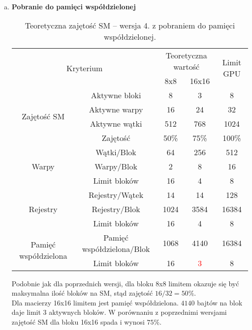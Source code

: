 \begin{enumerate}[(a)]
\item \textbf{Pobranie do pamięci współdzielonej} \newline

\begin{center}
\begin{table}[H]
\centering
\begin{tabular}{|c|c|c|c|c|}
\hline
\multicolumn{2}{|c|}{\multirow{2}{*}{Kryterium}} & \multicolumn{2}{c|}{Teoretyczna wartość} & \multirow{2}{*}{Limit GPU} \\ \cline{3-4}
\multicolumn{2}{|c|}{} & 8x8 & 16x16 & \\ \hline
\multirow{4}{*}{Zajętość SM} & Aktywne bloki & 8 & 3 & 8 \\ \cline{2-5}
& Aktywne warpy & 16 & 24 & 32 \\ \cline{2-5}
& Aktywne wątki & 512 & 768 & 1024 \\ \cline{2-5}
& Zajętość & 50\% & 75\% & 100\% \\ \hline
\multirow{3}{*}{Warpy} & Wątki/Blok & 64 & 256 & 512 \\ \cline{2-5}
& Warpy/Blok & 2 & 8 & 16 \\ \cline{2-5}
& Limit bloków & 16 & 4 & 8 \\ \hline
\multirow{3}{*}{Rejestry} & Rejestry/Wątek & 14 & 14 & 128 \\ \cline{2-5}
& Rejestry/Blok & 1024 & 3584 & 16384 \\ \cline{2-5}
& Limit bloków & 16 & 4 & 8 \\ \hline
\multirow{2}{*}{Pamięć współdzielona} & Pamięć współdzielona/Blok & 1068 & 4140 & 16384 \\ \cline{2-5}
& Limit bloków & 16 & \textcolor{red}{3} & 8 \\ \hline
\end{tabular}
\caption{Teoretyczna zajętość SM -- wersja 4. z pobraniem do pamięci współdzielonej.}
\end{table}
\end{center}

Podobnie jak dla poprzednich wersji, dla bloku 8x8 limitem okazuje się być maksymalna ilość bloków na SM, stąd zajętość $ 16 / 32 = 50\% $. \\
Dla macierzy 16x16 limitem jest pamięć współdzielona. $4140$ bajtów na blok daje limit $3$ aktywnych bloków. W porównaniu z poprzednimi wersjami zajętość SM dla bloku 16x16 spada i wynosi $ 75\% $. \\

\end{enumerate}

